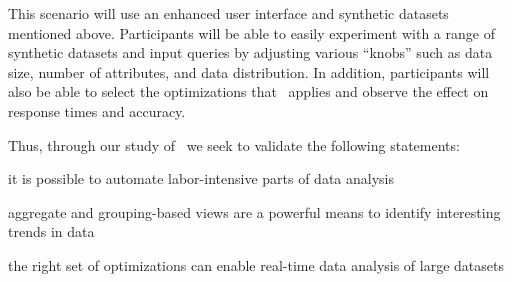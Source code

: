 

 This scenario
will use an enhanced user interface and synthetic datasets mentioned above.
Participants will be able to easily experiment with a range of synthetic datasets and input
queries by adjusting various ``knobs'' such as data size, number of attributes, and
data distribution. In addition, participants will also be able to select the
optimizations that \SeeDB\ applies and observe the effect on response times and
accuracy.

Thus, through our study of \SeeDB\, we seek to validate the following statements:

 \squishlist
   \item it is possible to automate labor-intensive parts of data analysis
   \item aggregate and grouping-based views are a powerful means to identify interesting trends in data
   \item the right set of optimizations can enable real-time data
analysis of large datasets
 \squishend
